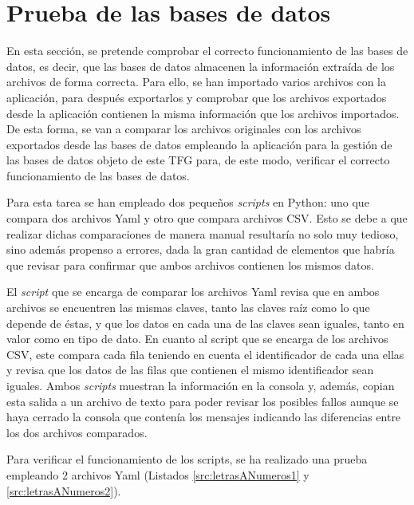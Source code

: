 \section{Prueba de las bases de datos}
\label{sec:compareFilesResults}

En esta sección, se pretende comprobar el correcto funcionamiento de las bases de datos, es decir, que las bases de datos almacenen la información extraída de los archivos de forma correcta. Para ello, se han importado varios archivos con la aplicación, para después exportarlos y comprobar que los archivos exportados desde la aplicación contienen la misma información que los archivos importados. De esta forma, se van a comparar los archivos originales con los archivos exportados desde las bases de datos empleando la aplicación para la gestión de las bases de datos objeto de este \acrshort{TFG} para, de este modo, verificar el correcto funcionamiento de las bases de datos.

Para esta tarea se han empleado dos pequeños \textit{scripts} en Python: uno que compara dos archivos \acrshort{Yaml} y otro que compara archivos \acrshort{CSV}. Esto se debe a que realizar dichas comparaciones de manera manual resultaría no solo muy tedioso, sino además propenso a errores, dada la gran cantidad de elementos que habría que revisar para confirmar que ambos archivos contienen los mismos datos.

El \textit{script} que se encarga de comparar los archivos \acrshort{Yaml} revisa que en ambos archivos se encuentren las mismas claves, tanto las claves raíz como lo que depende de éstas, y que los datos en cada una de las claves sean iguales, tanto en valor como en tipo de dato. En cuanto al script que se encarga de los archivos \acrshort{CSV}, este compara cada fila teniendo en cuenta el identificador de cada una ellas y revisa que los datos de las filas que contienen el mismo identificador sean iguales. Ambos \textit{scripts} muestran la información en la consola y, además, copian esta salida a un archivo de texto para poder revisar los posibles fallos aunque se haya cerrado la consola que contenía los mensajes indicando las diferencias entre los dos archivos comparados.

Para verificar el funcionamiento de los scripts, se ha realizado una prueba empleando 2 archivos \acrshort{Yaml} (Listados \ref{src:letrasANumeros1} y \ref{src:letrasANumeros2}).



